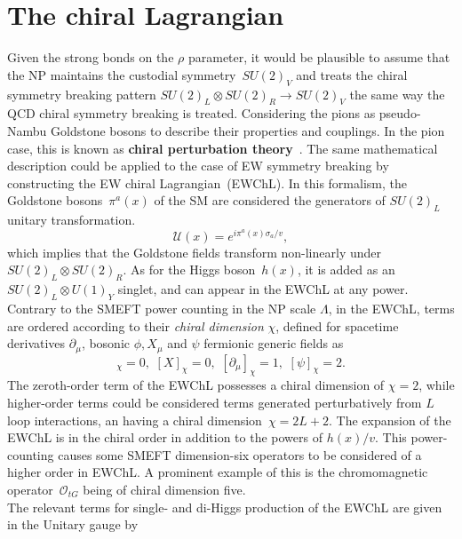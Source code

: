 \section{The chiral Lagrangian \label{sec:chiral}}
Given the strong bonds on the $\rho$ parameter, it would be plausible to assume that the NP maintains the custodial symmetry~$SU(2)_V$ and treats the chiral symmetry breaking pattern $SU(2)_L \otimes SU(2)_R \to SU(2)_V$  the same way the QCD chiral symmetry breaking is treated. Considering the pions as pseudo-Nambu Goldstone bosons to describe their properties and couplings. In the pion case, this is known as \textbf{chiral perturbation theory}~\cite{GASSER1984142, GASSER1985465}. The same mathematical description could be applied to the case of EW symmetry breaking by constructing the EW chiral Lagrangian~(EWChL).   In this formalism, the Goldstone bosons~$\pi^a(x)$ of the SM are considered the generators of $SU(2)_L$ unitary transformation.
\begin{equation}
	\mathcal U(x) = e^{ i \pi^a(x)\sigma_a/v }, 
\end{equation}
which implies that the Goldstone fields transform non-linearly under~$SU(2)_L \otimes SU(2)_R$.  As for the Higgs boson~$h(x)$, it is added as an $SU(2)_L \otimes U(1)_Y$ singlet, and can appear in the EWChL at any power. Contrary to the SMEFT power counting in the NP scale $ \Lambda$, in the EWChL, terms are ordered according to their \emph{chiral dimension} $\chi$, defined for spacetime derivatives $\partial_\mu$,  bosonic $\phi, X_\mu$ and $\psi$ fermionic generic fields as~\cite{Buchalla:2013rka,Buchalla:2015wfa}
\begin{equation}
	[\phi]_\chi =0,\,\, [X]_\chi =0,\,\, [\partial_\mu ]_\chi =1, \,\, [\psi]_\chi =2.
\end{equation}
The zeroth-order term of the EWChL possesses a chiral dimension of $\chi=2$, while higher-order terms could be considered terms generated perturbatively from $L$ loop interactions, an having a chiral dimension~$\chi= 2L+2$. The expansion of the EWChL is in the chiral order in addition to the powers of $h(x)/v$. This power-counting causes some SMEFT dimension-six operators to be considered of a higher order in EWChL. A prominent example of this is the chromomagnetic operator~$\mathcal O_{tG}$ being of chiral dimension five. \\
The relevant terms for single- and di-Higgs production of the EWChL are given in the Unitary gauge by~\cite{LHCHiggsCrossSectionWorkingGroup:2016ypw,DiVita:2017eyz}
